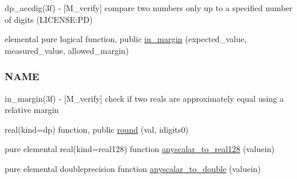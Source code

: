 \begin{DoxyCompactItemize}
\begin{DoxyCompactList}
dp\+\_\+accdig(3f) -\/ \mbox{[}M\+\_\+verify\mbox{]} compare two numbers only up to a specified number of digits (L\+I\+C\+E\+N\+SE\+:PD) \end{DoxyCompactList}\item 
elemental pure logical function, public \mbox{\hyperlink{namespacem__verify_aa0d8de1c26ca3aae0366b9fb8ead21c4}{in\+\_\+margin}} (expected\+\_\+value, measured\+\_\+value, allowed\+\_\+margin)
\begin{DoxyCompactList}\small\item\em \subsubsection*{N\+A\+ME}

in\+\_\+margin(3f) -\/ \mbox{[}M\+\_\+verify\mbox{]} check if two reals are approximately equal using a relative margin \end{DoxyCompactList}\item 
real(kind=dp) function, public \mbox{\hyperlink{namespacem__verify_af997c802e1ad966d55f023822b2f645a}{round}} (val, idigits0)
\item 
pure elemental real(kind=real128) function \mbox{\hyperlink{namespacem__verify_ab08d7bdca3b5d5e99732919be5880dc4}{anyscalar\+\_\+to\+\_\+real128}} (valuein)
\item 
pure elemental doubleprecision function \mbox{\hyperlink{namespacem__verify_a92278514bcbb93fefca1d925e3dfba65}{anyscalar\+\_\+to\+\_\+double}} (valuein)
\end{DoxyCompactItemize}
